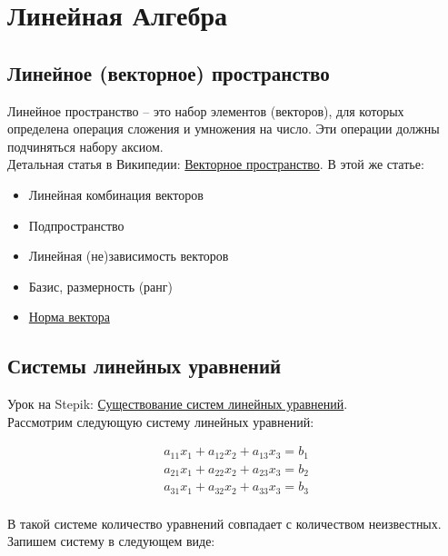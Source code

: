 \documentclass{article}
\begin{document}
\section{Линейная Алгебра}

\subsection{Линейное (векторное) пространство}

Линейное пространство -- это набор элементов (векторов), для которых определена операция сложения и умножения на число. Эти операции должны подчиняться набору аксиом. \\

Детальная статья в Википедии: \href{https://ru.wikipedia.org/wiki/%D0%92%D0%B5%D0%BA%D1%82%D0%BE%D1%80%D0%BD%D0%BE%D0%B5_%D0%BF%D1%80%D0%BE%D1%81%D1%82%D1%80%D0%B0%D0%BD%D1%81%D1%82%D0%B2%D0%BE}{Векторное пространство}. В этой же статье:
\begin{itemize}
	\item Линейная комбинация векторов
	\item Подпространство
	\item Линейная (не)зависимость векторов
	\item Базис, размерность (ранг)
	\item \href{https://ru.wikipedia.org/wiki/%D0%9D%D0%BE%D1%80%D0%BC%D0%B0_(%D0%BC%D0%B0%D1%82%D0%B5%D0%BC%D0%B0%D1%82%D0%B8%D0%BA%D0%B0)}{Норма вектора}
\end{itemize}

\subsection{Системы линейных уравнений}

Урок на Stepik: \href{https://stepik.org/course/2461/syllabus}{Существование систем линейных уравнений}. \\

Рассмотрим следующую систему линейных уравнений:

\[ \begin{array}{c}
	a_{11} x_{1} + a_{12} x_2 + a_{13} x_3 = b_1 \\
	a_{21} x_{1} + a_{22} x_2 + a_{23} x_3 = b_2 \\
	a_{31} x_{1} + a_{32} x_2 + a_{33} x_3 = b_3 \\
\end{array} \]

В такой системе количество уравнений совпадает с количеством неизвестных. Запишем систему в следующем виде:
\end{document}
